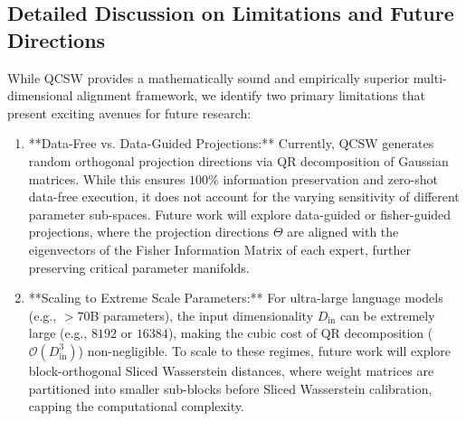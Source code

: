\documentclass{article}
\theoremstyle{plain}
\theoremstyle{definition}
\theoremstyle{remark}
\begin{document}
\subsection{Detailed Discussion on Limitations and Future Directions}
While QCSW provides a mathematically sound and empirically superior multi-dimensional alignment framework, we identify two primary limitations that present exciting avenues for future research:
\begin{enumerate}
    \item **Data-Free vs. Data-Guided Projections:** Currently, QCSW generates random orthogonal projection directions via QR decomposition of Gaussian matrices. While this ensures $100\%$ information preservation and zero-shot data-free execution, it does not account for the varying sensitivity of different parameter sub-spaces. Future work will explore data-guided or fisher-guided projections, where the projection directions $\Theta$ are aligned with the eigenvectors of the Fisher Information Matrix of each expert, further preserving critical parameter manifolds.
    \item **Scaling to Extreme Scale Parameters:** For ultra-large language models (e.g., $>70$B parameters), the input dimensionality $D_{\text{in}}$ can be extremely large (e.g., $8192$ or $16384$), making the cubic cost of QR decomposition ($\mathcal{O}(D_{\text{in}}^3)$) non-negligible. To scale to these regimes, future work will explore block-orthogonal Sliced Wasserstein distances, where weight matrices are partitioned into smaller sub-blocks before Sliced Wasserstein calibration, capping the computational complexity.
\end{enumerate}
\end{document}
